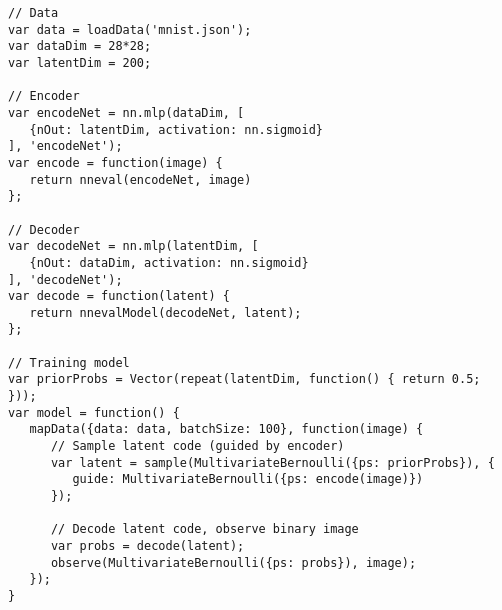 \begin{lstlisting}
// Data
var data = loadData('mnist.json');
var dataDim = 28*28;
var latentDim = 200;

// Encoder
var encodeNet = nn.mlp(dataDim, [
   {nOut: latentDim, activation: nn.sigmoid}
], 'encodeNet');
var encode = function(image) {
   return nneval(encodeNet, image)
};

// Decoder
var decodeNet = nn.mlp(latentDim, [
   {nOut: dataDim, activation: nn.sigmoid}
], 'decodeNet');
var decode = function(latent) {
   return nnevalModel(decodeNet, latent);
};

// Training model
var priorProbs = Vector(repeat(latentDim, function() { return 0.5; }));
var model = function() {
   mapData({data: data, batchSize: 100}, function(image) {
      // Sample latent code (guided by encoder)
      var latent = sample(MultivariateBernoulli({ps: priorProbs}), {
         guide: MultivariateBernoulli({ps: encode(image)})
      });

      // Decode latent code, observe binary image
      var probs = decode(latent);
      observe(MultivariateBernoulli({ps: probs}), image);
   });
}
\end{lstlisting}


